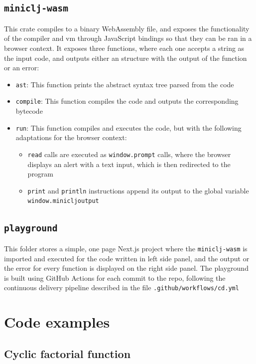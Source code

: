 \documentclass[11pt]{scrreprt}
\begin{document}
\section{\texttt{miniclj-wasm}}
This crate compiles to a binary WebAssembly file, and exposes the functionality of the compiler and vm through JavaScript bindings so that they can be ran in a browser context. It exposes three functions, where each one accepts a string as the input code, and outputs either an structure with the output of the function or an error:
\begin{itemize}
  \item \texttt{ast}: This function prints the abstract syntax tree parsed from the code
  \item \texttt{compile}: This function compiles the code and outputs the corresponding bytecode
  \item \texttt{run}: This function compiles and executes the code, but with the following adaptations for the browser context:
  \begin{itemize}
    \item \texttt{read} calls are executed as \texttt{window.prompt} calls, where the browser displays an alert with a text input, which is then redirected to the program
    \item \texttt{print} and \texttt{println} instructions append its output to the global variable \\\texttt{window.minicljoutput}
  \end{itemize}
\end{itemize}

\section{\texttt{playground}}
This folder stores a simple, one page Next.js project where the \texttt{miniclj-wasm} is imported and executed for the code written in left side panel, and the output or the error for every function is displayed on the right side panel. The playground is built using GitHub Actions for each commit to the repo, following the continuous delivery pipeline described in the file \texttt{.github/workflows/cd.yml}


\chapter{Code examples}
\label{examples}

\section{Cyclic factorial function}
\end{document}
